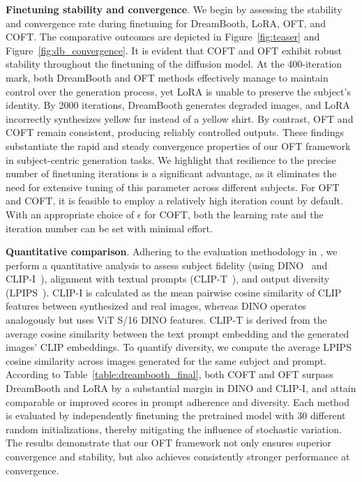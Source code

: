 \textbf{Finetuning stability and convergence}. We begin by assessing the stability and convergence rate during finetuning for DreamBooth, LoRA, OFT, and COFT. The comparative outcomes are depicted in Figure~\ref{fig:teaser} and Figure~\ref{fig:db_convergence}. It is evident that COFT and OFT exhibit robust stability throughout the finetuning of the diffusion model. At the 400-iteration mark, both DreamBooth and OFT methods effectively manage to maintain control over the generation process, yet LoRA is unable to preserve the subject’s identity. By 2000 iterations, DreamBooth generates degraded images, and LoRA incorrectly synthesizes yellow fur instead of a yellow shirt. By contrast, OFT and COFT remain consistent, producing reliably controlled outputs. These findings substantiate the rapid and steady convergence properties of our OFT framework in subject-centric generation tasks. We highlight that resilience to the precise number of finetuning iterations is a significant advantage, as it eliminates the need for extensive tuning of this parameter across different subjects. For OFT and COFT, it is feasible to employ a relatively high iteration count by default. With an appropriate choice of $\epsilon$ for COFT, both the learning rate and the iteration number can be set with minimal effort.

\textbf{Quantitative comparison}. Adhering to the evaluation methodology in \cite{ruiz2023dreambooth}, we perform a quantitative analysis to assess subject fidelity (using DINO~\cite{caron2021emerging} and CLIP-I~\cite{radford2021learning}), alignment with textual prompts (CLIP-T~\cite{radford2021learning}), and output diversity (LPIPS~\cite{zhang2018unreasonable}). CLIP-I is calculated as the mean pairwise cosine similarity of CLIP features between synthesized and real images, whereas DINO operates analogously but uses ViT S/16 DINO features. CLIP-T is derived from the average cosine similarity between the text prompt embedding and the generated images’ CLIP embeddings. To quantify diversity, we compute the average LPIPS cosine similarity across images generated for the same subject and prompt. According to Table~\ref{table:dreambooth_final}, both COFT and OFT surpass DreamBooth and LoRA by a substantial margin in DINO and CLIP-I, and attain comparable or improved scores in prompt adherence and diversity. Each method is evaluated by independently finetuning the pretrained model with 30 different random initializations, thereby mitigating the influence of stochastic variation. The results demonstrate that our OFT framework not only ensures superior convergence and stability, but also achieves consistently stronger performance at convergence.

